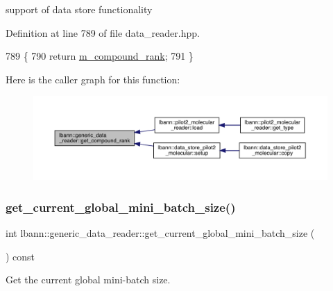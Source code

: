 support of data store functionality 



Definition at line 789 of file data\+\_\+reader.\+hpp.


\begin{DoxyCode}
789                           \{
790     \textcolor{keywordflow}{return} \hyperlink{classlbann_1_1generic__data__reader_a7df02a1534b100df6f718dc7a7b32b25}{m\_compound\_rank};
791   \}
\end{DoxyCode}
Here is the caller graph for this function\+:\nopagebreak
\begin{figure}[H]
\begin{center}
\leavevmode
\includegraphics[width=350pt]{classlbann_1_1generic__data__reader_ac4fc0729e7f1240e167fe897df99f950_icgraph}
\end{center}
\end{figure}
\mbox{\label{classlbann_1_1generic__data__reader_a3f7114448c6b43a5aac30c002e4bade3}} 
\subsubsection{\texorpdfstring{get\+\_\+current\+\_\+global\+\_\+mini\+\_\+batch\+\_\+size()}{get\_current\_global\_mini\_batch\_size()}}
{\footnotesize\ttfamily int lbann\+::generic\+\_\+data\+\_\+reader\+::get\+\_\+current\+\_\+global\+\_\+mini\+\_\+batch\+\_\+size (\begin{DoxyParamCaption}{ }\end{DoxyParamCaption}) const}



Get the current global mini-\/batch size. 



